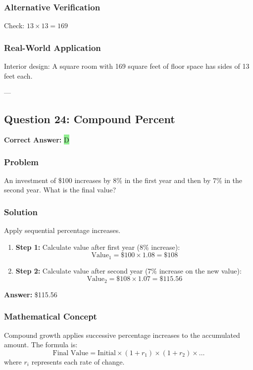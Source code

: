 \documentclass[12pt]{article}
\begin{document}
\subsubsection*{Alternative Verification}
Check: $13 \times 13 = 169$ 

\subsubsection*{Real-World Application}
Interior design: A square room with 169 square feet of floor space has sides of 13 feet each.

---

\subsection{Question 24: Compound Percent}

\textbf{Correct Answer: } \colorbox{lightgreen}{D}

\subsubsection*{Problem}
An investment of \$100 increases by 8\% in the first year and then by 7\% in the second year. What is the final value?

\subsubsection*{Solution}

Apply sequential percentage increases.

\begin{enumerate}
\item \textbf{Step 1:} Calculate value after first year (8\% increase):
  \[
  \text{Value}_1 = \$100 \times 1.08 = \$108
  \]
\item \textbf{Step 2:} Calculate value after second year (7\% increase on the new value):
  \[
  \text{Value}_2 = \$108 \times 1.07 = \$115.56
  \]
\end{enumerate}

\textbf{Answer: } \$115.56

\subsubsection*{Mathematical Concept}
Compound growth applies successive percentage increases to the accumulated amount. The formula is:
\[
\text{Final Value} = \text{Initial} \times (1 + r_1) \times (1 + r_2) \times \ldots
\]
where $r_i$ represents each rate of change.
\end{document}
